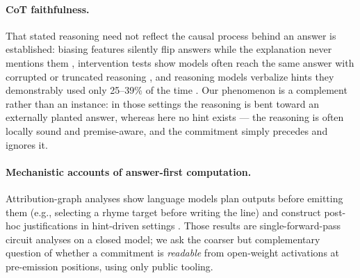 \documentclass[11pt]{article}
\begin{document}
\paragraph{CoT faithfulness.} That stated reasoning need not reflect the
causal process behind an answer is established: biasing features silently
flip answers while the explanation never mentions them \citep{turpin},
intervention tests show models often reach the same answer with corrupted
or truncated reasoning \citep{lanham}, and reasoning models verbalize
hints they demonstrably used only 25--39\% of the time \citep{chen}. Our
phenomenon is a complement rather than an instance: in those settings the
reasoning is bent toward an externally planted answer, whereas here no
hint exists --- the reasoning is often locally sound and premise-aware,
and the commitment simply precedes and ignores it.

\paragraph{Mechanistic accounts of answer-first computation.}
Attribution-graph analyses show language models plan outputs before
emitting them (e.g., selecting a rhyme target before writing the line) and
construct post-hoc justifications in hint-driven settings
\citep{lindsey,ameisen}. Those results are single-forward-pass circuit
analyses on a closed model; we ask the coarser but complementary question
of whether a commitment is \emph{readable} from open-weight activations at
pre-emission positions, using only public tooling.
\end{document}
